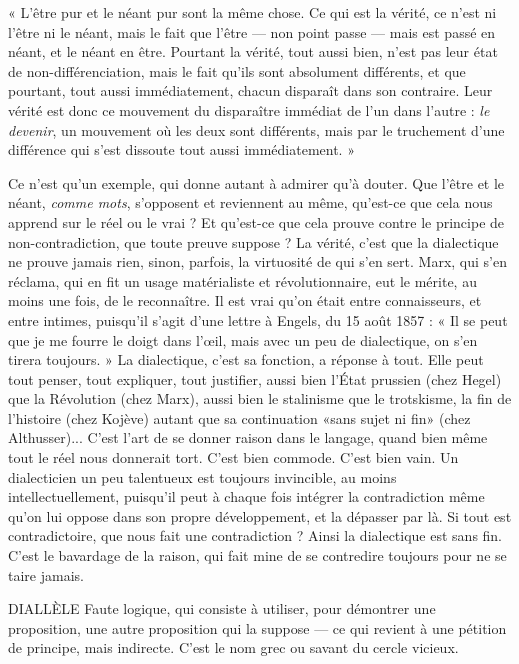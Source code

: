\vspace{0.5cm}
{\footnotesize
« L’être pur et le néant pur sont la même chose. Ce qui est la vérité, ce n’est ni l'être
ni le néant, mais le fait que l'être — non point passe — mais est passé en néant, et le
néant en être. Pourtant la vérité, tout aussi bien, n’est pas leur état de non-différenciation,
mais le fait qu’ils sont absolument différents, et que pourtant, tout aussi immédiatement,
chacun disparaît dans son contraire. Leur vérité est donc ce mouvement du disparaître
immédiat de l’un dans l’autre : {\it le devenir}, un mouvement où les deux sont
différents, mais par le truchement d’une différence qui s’est dissoute tout aussi
immédiatement. »
}
\vspace{0.5cm}

Ce n’est qu’un exemple, qui donne autant à admirer qu’à douter. Que
l'être et le néant, {\it comme mots}, s'opposent et reviennent au même, qu'est-ce
que cela nous apprend sur le réel ou le vrai ? Et qu'est-ce que cela prouve
contre le principe de non-contradiction, que toute preuve suppose ? La
vérité, c’est que la dialectique ne prouve jamais rien, sinon, parfois, la virtuosité
de qui s’en sert. Marx, qui s’en réclama, qui en fit un usage matérialiste
et révolutionnaire, eut le mérite, au moins une fois, de le reconnaître. Il est
vrai qu'on était entre connaisseurs, et entre intimes, puisqu'il s’agit d’une
lettre à Engels, du 15 août 1857 : « Il se peut que je me fourre le doigt dans
l'œil, mais avec un peu de dialectique, on s’en tirera toujours. » La dialectique,
c’est sa fonction, a réponse à tout. Elle peut tout penser, tout expliquer,
tout justifier, aussi bien l’État prussien (chez Hegel) que la Révolution
(chez Marx), aussi bien le stalinisme que le trotskisme, la fin de l’histoire
(chez Kojève) autant que sa continuation «sans sujet ni fin» (chez
Althusser)... C’est l’art de se donner raison dans le langage, quand bien
même tout le réel nous donnerait tort. C’est bien commode. C’est bien vain.
Un dialecticien un peu talentueux est toujours invincible, au moins intellectuellement,
puisqu'il peut à chaque fois intégrer la contradiction même
qu’on lui oppose dans son propre développement, et la dépasser par là. Si
tout est contradictoire, que nous fait une contradiction ? Ainsi la dialectique
est sans fin. C’est le bavardage de la raison, qui fait mine de se contredire toujours
pour ne se taire jamais.

DIALLÈLE Faute logique, qui consiste à utiliser, pour démontrer une proposition,
une autre proposition qui la suppose — ce qui revient
à une pétition de principe, mais indirecte. C’est le nom grec ou savant du cercle
vicieux.

